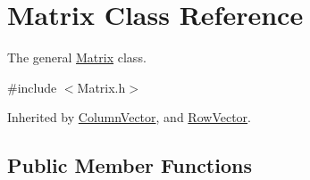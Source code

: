 \hypertarget{class_matrix}{
\section{Matrix Class Reference}
\label{class_matrix}
}


The general \hyperlink{class_matrix}{Matrix} class.  




{\ttfamily \#include $<$Matrix.h$>$}



Inherited by \hyperlink{class_column_vector}{ColumnVector}, and \hyperlink{class_row_vector}{RowVector}.

\subsection*{Public Member Functions}
